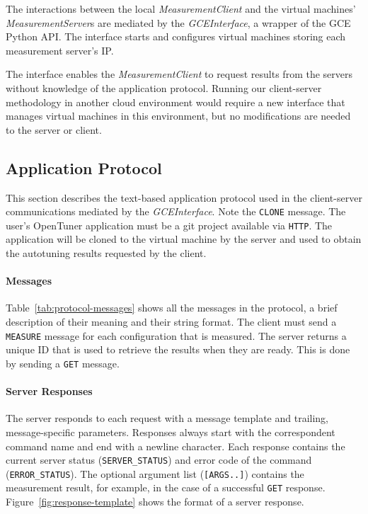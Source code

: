 The interactions between the local \emph{MeasurementClient} and the virtual
machines' \emph{MeasurementServer}s are mediated by the
\emph{GCEInterface}, a wrapper of the GCE Python API.
The interface starts and configures virtual machines
storing each measurement server's IP.

The interface enables the \emph{MeasurementClient} to request results from
the servers without knowledge of the application protocol. Running our
client-server methodology in another cloud environment would require a
new interface that manages virtual machines in this environment, but no
modifications are needed to the server or client.

\subsection{Application Protocol}
\label{sec:app}

This section describes the text-based application protocol used in the
client-server communications mediated by the \emph{GCEInterface}. Note the
\texttt{\footnotesize CLONE} message. The user's OpenTuner application must
be a git project available via \texttt{\footnotesize{HTTP}}. The application
will be cloned to the virtual machine by the server and used to obtain the
autotuning results requested by the client.

\paragraph{Messages}


Table~\ref{tab:protocol-messages} shows all the messages in the protocol,
a brief description of their meaning and their string format. The client
must send a \texttt{\footnotesize MEASURE} message for each configuration
that is measured. The server returns a unique ID that is used to retrieve
the results when they are ready. This is done by sending a
\texttt{\footnotesize GET} message.

\paragraph{Server Responses}

The server responds to each request with a message template and
trailing, message-specific parameters. Responses always start
with the correspondent command name and end with a newline character.
Each response contains the current server status (\texttt{\footnotesize SERVER\_STATUS})
and error code of the command (\texttt{\footnotesize ERROR\_STATUS}).
The optional argument list (\texttt{\footnotesize [ARGS..]}) contains the
measurement result, for example, in the case of a successful
\texttt{\footnotesize GET} response. Figure~\ref{fig:response-template}
shows the format of a server response.

